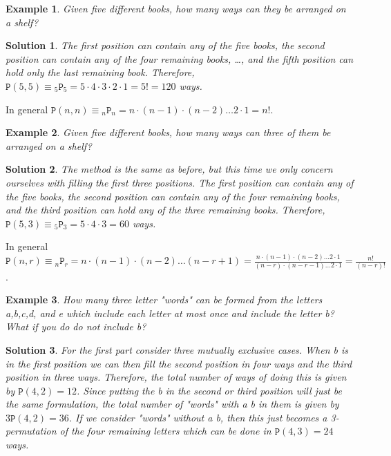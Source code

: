 \documentclass[12pt, letterpaper, onecolumn, conference, final]{IEEEtran}
\theoremstyle{definition}
\theoremstyle{plain}
\newtheorem{example}{Example}[section]
\newtheorem{solution}{Solution}[section]
\begin{document}
\begin{example}
Given five different books, how many ways can they be arranged on a shelf?
\end{example}
\begin{solution}
The first position can contain any of the five books, the second position can contain any of the four remaining books, \dots, and the fifth position can hold only the last remaining book. Therefore, $\mathtt{P}(5,5) \equiv {}_5 \mathtt{P}_5 = 5 \cdot 4 \cdot 3 \cdot 2 \cdot 1 = 5! = 120$ ways.
\end{solution}

\noindent
In general $\mathtt{P}(n,n) \equiv {}_n \mathtt{P}_n = n \cdot (n-1) \cdot (n-2) \dots 2 \cdot 1 = n!$.

\begin{example}
Given five different books, how many ways can three of them be arranged on a shelf?
\end{example}
\begin{solution}
The method is the same as before, but this time we only concern ourselves with filling the first three positions. The first position can contain any of the five books, the second position can contain any of the four remaining books, and the third position can hold any of the three remaining books. Therefore, $\mathtt{P}(5,3) \equiv {}_5 \mathtt{P}_3 = 5 \cdot 4 \cdot 3 = 60$ ways.
\end{solution}

\noindent
In general $\mathtt{P}(n,r) \equiv {}_n \mathtt{P}_r = n \cdot (n-1) \cdot (n-2) \dots (n-r+1) = \frac{n \cdot (n-1) \cdot (n-2) \dots 2 \cdot 1}{(n-r) \cdot (n-r-1) \dots 2 \cdot 1} = \frac{n!}{(n-r)!}$.
\begin{example}
How many three letter "words" can be formed from the letters a,b,c,d, and e which include each letter at most once and include the letter b? What if you do do not include b?
\end{example}
\begin{solution}
For the first part consider three mutually exclusive cases. When b is in the first position we can then fill the second position in four ways and the third position in three ways. Therefore, the total number of ways of doing this is given by $\mathtt{P}(4,2) = 12$. Since putting the b in the second or third position will just be the same formulation, the total number of "words" with a b in them is given by $3\mathtt{P}(4,2) = 36$. If we consider "words" without a b, then this just becomes a 3-permutation of the four remaining letters which can be done in $\mathtt{P}(4,3) = 24$ ways.
\end{solution}
\end{document}

